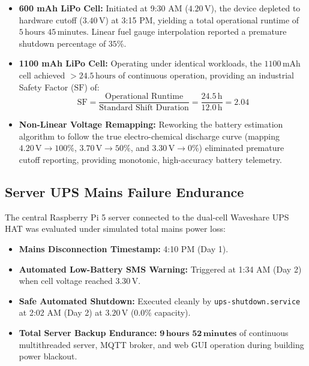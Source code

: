 \begin{itemize}
    \item \textbf{600 mAh LiPo Cell:} Initiated at 9:30 AM ($4.20\,\text{V}$), the device depleted to hardware cutoff ($3.40\,\text{V}$) at 3:15 PM, yielding a total operational runtime of $5\,\text{hours } 45\,\text{minutes}$. Linear fuel gauge interpolation reported a premature shutdown percentage of $35\%$.
    \item \textbf{1100 mAh LiPo Cell:} Operating under identical workloads, the $1100\,\text{mAh}$ cell achieved $>24.5\,\text{hours}$ of continuous operation, providing an industrial Safety Factor ($\text{SF}$) of:
    \begin{equation}
    \text{SF} = \frac{\text{Operational Runtime}}{\text{Standard Shift Duration}} = \frac{24.5\,\text{h}}{12.0\,\text{h}} = \mathbf{2.04}
    \end{equation}
    \item \textbf{Non-Linear Voltage Remapping:} Reworking the battery estimation algorithm to follow the true electro-chemical discharge curve (mapping $4.20\,\text{V} \rightarrow 100\%$, $3.70\,\text{V} \rightarrow 50\%$, and $3.30\,\text{V} \rightarrow 0\%$) eliminated premature cutoff reporting, providing monotonic, high-accuracy battery telemetry.
\end{itemize}

\subsection{Server UPS Mains Failure Endurance}
The central Raspberry Pi 5 server connected to the dual-cell Waveshare UPS HAT was evaluated under simulated total mains power loss:
\begin{itemize}
    \item \textbf{Mains Disconnection Timestamp:} 4:10 PM (Day 1).
    \item \textbf{Automated Low-Battery SMS Warning:} Triggered at 1:34 AM (Day 2) when cell voltage reached $3.30\,\text{V}$.
    \item \textbf{Safe Automated Shutdown:} Executed cleanly by \texttt{ups-shutdown.service} at 2:02 AM (Day 2) at $3.20\,\text{V}$ ($0.0\%$ capacity).
    \item \textbf{Total Server Backup Endurance:} $\mathbf{9\,\text{hours } 52\,\text{minutes}}$ of continuous multithreaded server, MQTT broker, and web GUI operation during building power blackout.
\end{itemize}

